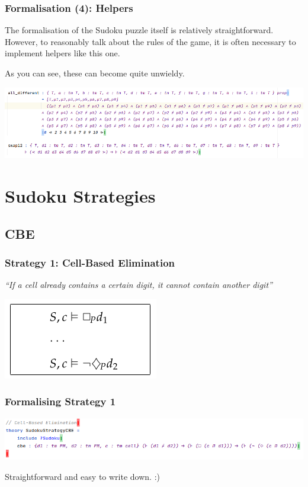 \documentclass[aspectratio=169, usenames, dvipsnames]{beamer}
\begin{document}
\begin{frame}
\frametitle{Formalisation (4): Helpers}
The formalisation of the Sudoku puzzle itself is relatively straightforward. However, 
to reasonably talk about the rules of the game, it is often necessary to implement
helpers like this one.

As you can see, these can become quite unwieldy.

\begin{center}
\includegraphics[scale=0.39]{images/helpers.png} 
\end{center}
\end{frame}

\section{Sudoku Strategies}

\subsection{CBE}
\begin{frame}
\frametitle{Strategy 1: Cell-Based Elimination}
\begin{center}
\emph{``If a cell already contains a certain digit, it cannot contain another digit''}
\bigskip

\includegraphics[scale=0.5]{images/strategy_nd_cbe.png} 
\end{center}
\end{frame}

\begin{frame}
\frametitle{Formalising Strategy 1}
\begin{center}
\includegraphics[width=\textwidth, keepaspectratio]{images/strategy_form_cbe.png} 
\pause\bigskip

Straightforward and easy to write down. :)
\end{center}
\end{frame}
\end{document}

